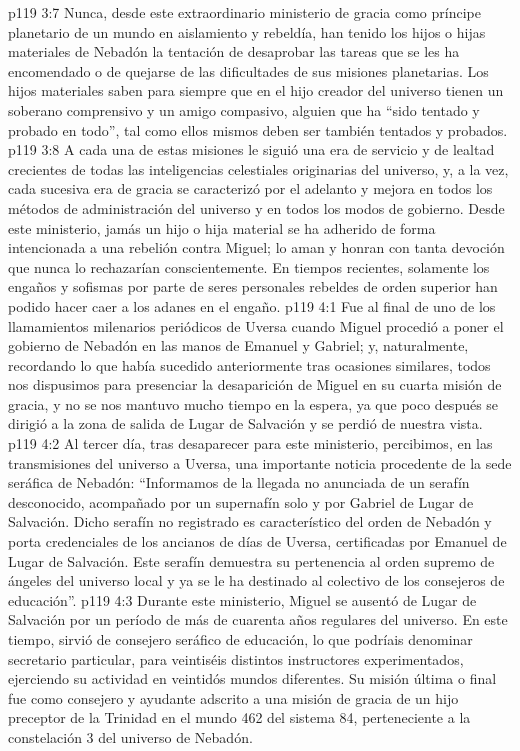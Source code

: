 \vs p119 3:7 \pc Nunca, desde este extraordinario ministerio de gracia como príncipe planetario de un mundo en aislamiento y rebeldía, han tenido los hijos o hijas materiales de Nebadón la tentación de desaprobar las tareas que se les ha encomendado o de quejarse de las dificultades de sus misiones planetarias. Los hijos materiales saben para siempre que en el hijo creador del universo tienen un soberano comprensivo y un amigo compasivo, alguien que ha “sido tentado y probado en todo”, tal como ellos mismos deben ser también tentados y probados.
\vs p119 3:8 A cada una de estas misiones le siguió una era de servicio y de lealtad crecientes de todas las inteligencias celestiales originarias del universo, y, a la vez, cada sucesiva era de gracia se caracterizó por el adelanto y mejora en todos los métodos de administración del universo y en todos los modos de gobierno. Desde este ministerio, jamás un hijo o hija material se ha adherido de forma intencionada a una rebelión contra Miguel; lo aman y honran con tanta devoción que nunca lo rechazarían conscientemente. En tiempos recientes, solamente los engaños y sofismas por parte de seres personales rebeldes de orden superior han podido hacer caer a los adanes en el engaño.
\vs p119 4:1 Fue al final de uno de los llamamientos milenarios periódicos de Uversa cuando Miguel procedió a poner el gobierno de Nebadón en las manos de Emanuel y Gabriel; y, naturalmente, recordando lo que había sucedido anteriormente tras ocasiones similares, todos nos dispusimos para presenciar la desaparición de Miguel en su cuarta misión de gracia, y no se nos mantuvo mucho tiempo en la espera, ya que poco después se dirigió a la zona de salida de Lugar de Salvación y se perdió de nuestra vista.
\vs p119 4:2 Al tercer día, tras desaparecer para este ministerio, percibimos, en las transmisiones del universo a Uversa, una importante noticia procedente de la sede seráfica de Nebadón: “Informamos de la llegada no anunciada de un serafín desconocido, acompañado por un supernafín solo y por Gabriel de Lugar de Salvación. Dicho serafín no registrado es característico del orden de Nebadón y porta credenciales de los ancianos de días de Uversa, certificadas por Emanuel de Lugar de Salvación. Este serafín demuestra su pertenencia al orden supremo de ángeles del universo local y ya se le ha destinado al colectivo de los consejeros de educación”.
\vs p119 4:3 Durante este ministerio, Miguel se ausentó de Lugar de Salvación por un período de más de cuarenta años regulares del universo. En este tiempo, sirvió de consejero seráfico de educación, lo que podríais denominar secretario particular, para veintiséis distintos instructores experimentados, ejerciendo su actividad en veintidós mundos diferentes. Su misión última o final fue como consejero y ayudante adscrito a una misión de gracia de un hijo preceptor de la Trinidad en el mundo 462 del sistema 84, perteneciente a la constelación 3 del universo de Nebadón.

